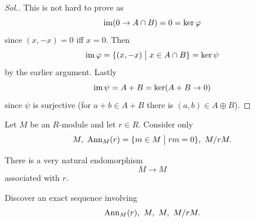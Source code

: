 \documentclass[11pt]{article}
\begin{document}
\begin{proof}[Sol.]
    This is not hard to prove as 
    \[
        \operatorname{im}(0 \to A\cap B) = 0 = \ker\varphi 
    \]
    since $(x,-x) = 0$ iff $x = 0$. Then 
    \[
        \operatorname{im}\varphi = \{(x,-x) \bigm| x \in A \cap B\} 
        = \ker \psi 
    \]
    by the earlier argument. 
    Lastly 
    \[
        \operatorname{im} \psi = A + B = \ker (A + B \to 0)   
    \]
    since $\psi$ is surjective (for $a+b \in A+B$ there 
    is $(a,b) \in A \oplus B$). 
\end{proof}

\begin{prob}
    Let $M$ be an $R$-module and let 
    $r \in R$. Consider only 
    \[
        M, \ \operatorname{Ann}_M(r) = \{m \in M \bigm| rm = 0\}, 
        \ M/rM. 
    \]

    There is a very natural endomorphism 
    \[
        M \to M 
    \]
    associated with $r$. 

    Discover an exact sequence involving 
    \[
        \operatorname{Ann}_M(r), \ M, \ M, \ M/rM.
    \]
\end{prob}
\end{document}
